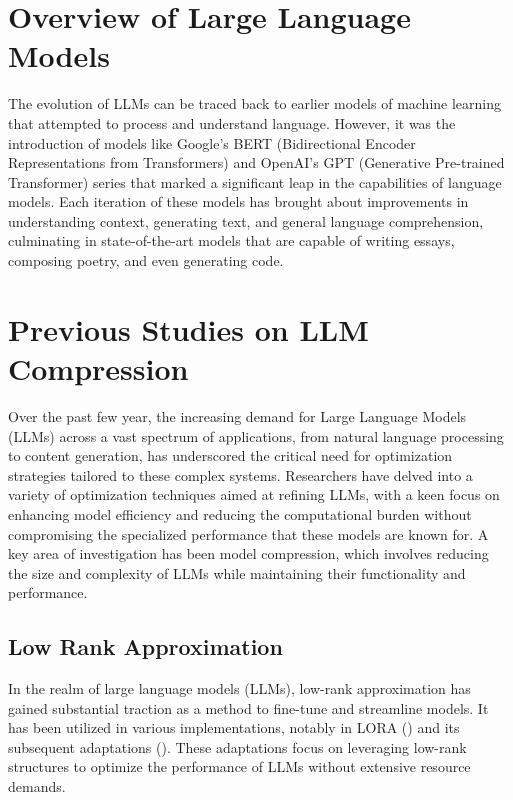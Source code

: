 \section{Overview of Large Language Models}
The evolution of LLMs can be traced back to earlier models of machine learning that attempted to process and understand language. However, it was the introduction of models like Google's BERT (Bidirectional Encoder Representations from Transformers) and OpenAI's GPT (Generative Pre-trained Transformer) series that marked a significant leap in the capabilities of language models. Each iteration of these models has brought about improvements in understanding context, generating text, and general language comprehension, culminating in state-of-the-art models that are capable of writing essays, composing poetry, and even generating code.

\section{Previous Studies on LLM Compression}
    Over the past few year, the increasing demand for Large Language Models (LLMs) across a vast spectrum of applications, from natural language processing to content generation, has underscored the critical need for optimization strategies tailored to these complex systems. Researchers have delved into a variety of optimization techniques aimed at refining LLMs, with a keen focus on enhancing model efficiency and reducing the computational burden without compromising the specialized performance that these models are known for.
    A key area of investigation has been model compression, which involves reducing the size and complexity of LLMs while maintaining their functionality and performance. \\

    \subsection*{Low Rank Approximation}
        In the realm of large language models (LLMs), low-rank approximation has gained substantial traction as a method to fine-tune and streamline models. It has been utilized in various implementations, notably in LORA (\cite{hu2021lora}) and its subsequent adaptations (\cite{valipour-etal-2023-dylora, zhang2023adaptive, chavan2024oneforall}). These adaptations focus on leveraging low-rank structures to optimize the performance of LLMs without extensive resource demands.
        
